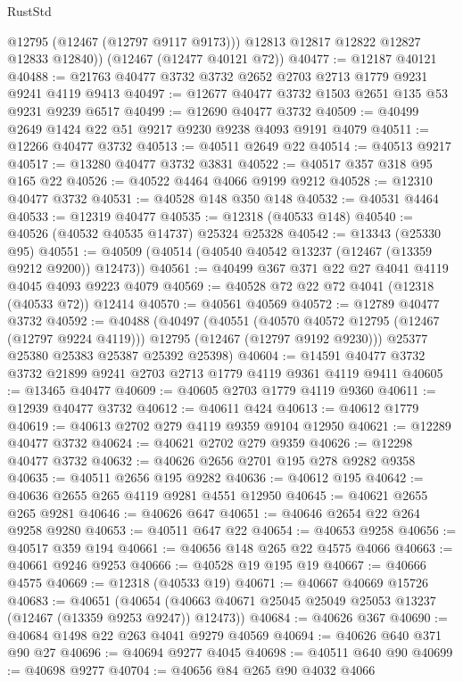 \begin{lexlean}{RustStd}
\begin{coremodule}
          @12795
          (@12467 (@12797 @9117 @9173)))
        @12813
        @12817
        @12822
        @12827
        @12833
        @12840))
    (@12467 (@12477 @40121 @72))
@40477 := @12187 @40121
@40488 := @21763 @40477 @3732 @3732 @2652 @2703 @2713 @1779 @9231 @9241 @4119 @9413
@40497 := @12677 @40477 @3732 @1503 @2651 @135 @53 @9231 @9239 @6517
@40499 := @12690 @40477 @3732
@40509 := @40499 @2649 @1424 @22 @51 @9217 @9230 @9238 @4093 @9191 @4079
@40511 := @12266 @40477 @3732
@40513 := @40511 @2649 @22
@40514 := @40513 @9217
@40517 := @13280 @40477 @3732 @3831
@40522 := @40517 @357 @318 @95 @165 @22
@40526 := @40522 @4464 @4066 @9199 @9212
@40528 := @12310 @40477 @3732
@40531 := @40528 @148 @350 @148
@40532 := @40531 @4464
@40533 := @12319 @40477
@40535 := @12318 (@40533 @148)
@40540 := @40526 (@40532 @40535 @14737) @25324 @25328
@40542 := @13343 (@25330 @95)
@40551 := @40509 (@40514 (@40540 @40542 @13237 (@12467 (@13359 @9212 @9200)) @12473))
@40561 := @40499 @367 @371 @22 @27 @4041 @4119 @4045 @4093 @9223 @4079
@40569 := @40528 @72 @22 @72 @4041 (@12318 (@40533 @72)) @12414
@40570 := @40561 @40569
@40572 := @12789 @40477 @3732
@40592 := @40488
    (@40497
      (@40551
        (@40570 @40572 @12795 (@12467 (@12797 @9224 @4119)))
        @12795
        (@12467 (@12797 @9192 @9230)))
      @25377
      @25380
      @25383
      @25387
      @25392
      @25398)
@40604 := @14591 @40477 @3732 @3732 @21899 @9241 @2703 @2713 @1779 @4119 @9361 @4119 @9411
@40605 := @13465 @40477
@40609 := @40605 @2703 @1779 @4119 @9360
@40611 := @12939 @40477 @3732
@40612 := @40611 @424
@40613 := @40612 @1779
@40619 := @40613 @2702 @279 @4119 @9359 @9104 @12950
@40621 := @12289 @40477 @3732
@40624 := @40621 @2702 @279 @9359
@40626 := @12298 @40477 @3732
@40632 := @40626 @2656 @2701 @195 @278 @9282 @9358
@40635 := @40511 @2656 @195 @9282
@40636 := @40612 @195
@40642 := @40636 @2655 @265 @4119 @9281 @4551 @12950
@40645 := @40621 @2655 @265 @9281
@40646 := @40626 @647
@40651 := @40646 @2654 @22 @264 @9258 @9280
@40653 := @40511 @647 @22
@40654 := @40653 @9258
@40656 := @40517 @359 @194
@40661 := @40656 @148 @265 @22 @4575 @4066
@40663 := @40661 @9246 @9253
@40666 := @40528 @19 @195 @19
@40667 := @40666 @4575
@40669 := @12318 (@40533 @19)
@40671 := @40667 @40669 @15726
@40683 := @40651
    (@40654 (@40663 @40671 @25045 @25049 @25053 @13237 (@12467 (@13359 @9253 @9247)) @12473))
@40684 := @40626 @367
@40690 := @40684 @1498 @22 @263 @4041 @9279 @40569
@40694 := @40626 @640 @371 @90 @27
@40696 := @40694 @9277 @4045
@40698 := @40511 @640 @90
@40699 := @40698 @9277
@40704 := @40656 @84 @265 @90 @4032 @4066

\end{coremodule}
\end{lexlean}
